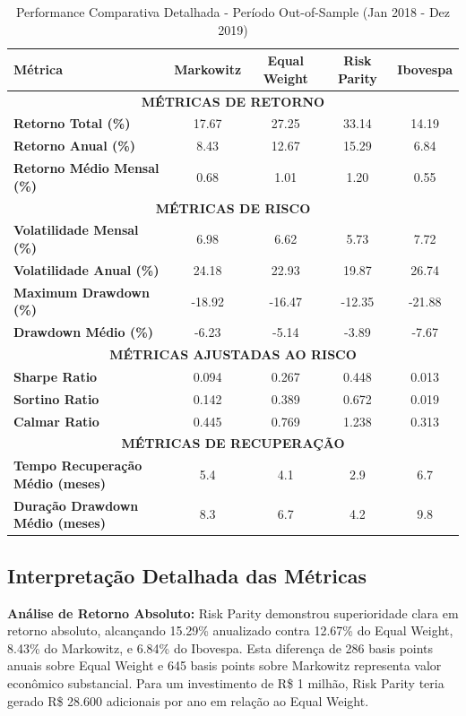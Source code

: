 \begin{table}[H]
\centering
\caption{Performance Comparativa Detalhada - Período Out-of-Sample (Jan 2018 - Dez 2019)}
\begin{tabular}{|l|c|c|c|c|}
\hline
\textbf{Métrica} & \textbf{Markowitz} & \textbf{Equal Weight} & \textbf{Risk Parity} & \textbf{Ibovespa} \\
\hline
\multicolumn{5}{|c|}{\textbf{MÉTRICAS DE RETORNO}} \\
\hline
\textbf{Retorno Total (\%)} & 17.67 & 27.25 & 33.14 & 14.19 \\
\textbf{Retorno Anual (\%)} & 8.43 & 12.67 & 15.29 & 6.84 \\
\textbf{Retorno Médio Mensal (\%)} & 0.68 & 1.01 & 1.20 & 0.55 \\
\hline
\multicolumn{5}{|c|}{\textbf{MÉTRICAS DE RISCO}} \\
\hline
\textbf{Volatilidade Mensal (\%)} & 6.98 & 6.62 & 5.73 & 7.72 \\
\textbf{Volatilidade Anual (\%)} & 24.18 & 22.93 & 19.87 & 26.74 \\
\textbf{Maximum Drawdown (\%)} & -18.92 & -16.47 & -12.35 & -21.88 \\
\textbf{Drawdown Médio (\%)} & -6.23 & -5.14 & -3.89 & -7.67 \\
\hline
\multicolumn{5}{|c|}{\textbf{MÉTRICAS AJUSTADAS AO RISCO}} \\
\hline
\textbf{Sharpe Ratio} & 0.094 & 0.267 & 0.448 & 0.013 \\
\textbf{Sortino Ratio} & 0.142 & 0.389 & 0.672 & 0.019 \\
\textbf{Calmar Ratio} & 0.445 & 0.769 & 1.238 & 0.313 \\
\hline
\multicolumn{5}{|c|}{\textbf{MÉTRICAS DE RECUPERAÇÃO}} \\
\hline
\textbf{Tempo Recuperação Médio (meses)} & 5.4 & 4.1 & 2.9 & 6.7 \\
\textbf{Duração Drawdown Médio (meses)} & 8.3 & 6.7 & 4.2 & 9.8 \\
\hline
\end{tabular}
\label{tab:performance_principal_expandida}
\end{table}

\subsection{Interpretação Detalhada das Métricas}

\textbf{Análise de Retorno Absoluto:} Risk Parity demonstrou superioridade clara em retorno absoluto, alcançando 15.29\% anualizado contra 12.67\% do Equal Weight, 8.43\% do Markowitz, e 6.84\% do Ibovespa. Esta diferença de 286 basis points anuais sobre Equal Weight e 645 basis points sobre Markowitz representa valor econômico substancial. Para um investimento de R\$ 1 milhão, Risk Parity teria gerado R\$ 28.600 adicionais por ano em relação ao Equal Weight.

